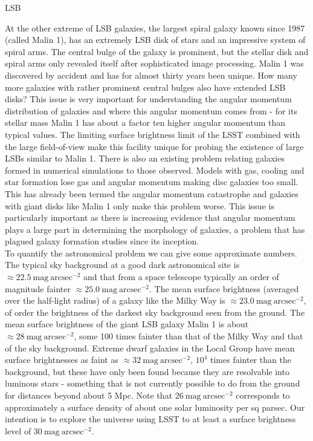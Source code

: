 {\begin{tasklist}{LSB}
\begin{task}
{At the other extreme of LSB galaxies, the largest spiral galaxy known since 1987 (called Malin 1), has an extremely LSB disk of stars and an impressive system of spiral arms. The central bulge of the galaxy is prominent, but the stellar disk and spiral arms only revealed itself after sophisticated image processing. Malin 1 was discovered by accident and has for almost thirty years been unique. How many more galaxies with rather prominent central bulges also have extended LSB disks? This issue is very important for understanding the angular momentum distribution of galaxies and where this angular momentum comes from - for its stellar mass Malin 1 has about a factor ten higher angular momentum than typical values. The limiting surface brightness limit of the LSST combined with the large field-of-view make this facility unique for probing the existence of large LSBs similar to Malin 1. There is also an existing problem relating galaxies formed in numerical simulations to those observed. Models with gas, cooling and star formation lose gas and angular momentum making disc galaxies too small. This has already been termed the angular momentum catastrophe and galaxies with giant disks like Malin 1 only make this problem worse. This issue is particularly important as there is increasing evidence that angular momentum plays a large part in determining the morphology of galaxies, a problem that has plagued galaxy formation studies since its inception.  
\\
To quantify the astronomical problem we can give some approximate numbers. The typical sky background at a good dark astronomical site is $\approx22.5~\mathrm{mag}~\mathrm{arcsec}^{-2}$ and that from a space telescope typically an order of magnitude fainter $\approx25.0~\mathrm{mag}~\mathrm{arcsec}^{-2}$. The mean surface brightness (averaged over the half-light radius) of a galaxy like the Milky Way is $\approx23.0~\mathrm{mag}~\mathrm{arcsec}^{-2}$, of order the brightness of the darkest sky background seen from the ground. The mean surface brightness of the giant LSB galaxy Malin 1 is about $\approx28~\mathrm{mag}~\mathrm{arcsec}^{-2}$, some 100 times fainter than that of the Milky Way and that of the sky background. Extreme dwarf galaxies in the Local Group have mean surface brightnesses as faint as $\approx32~\mathrm{mag}~\mathrm{arcsec}^{-2}$, $10^4$ times fainter than the background, but these have only been found because they are resolvable into luminous stars - something that is not currently possible to do from the ground for distances beyond about 5 Mpc. Note that $26~\mathrm{mag}~\mathrm{arcsec}^{-2}$ corresponds to approximately a surface density of about one solar luminosity per sq parsec. Our intention is to explore the universe using LSST to at least a surface brightness level of $30~\mathrm{mag}~\mathrm{arcsec}^{-2}$.
}
\end{task}
\end{tasklist}}
